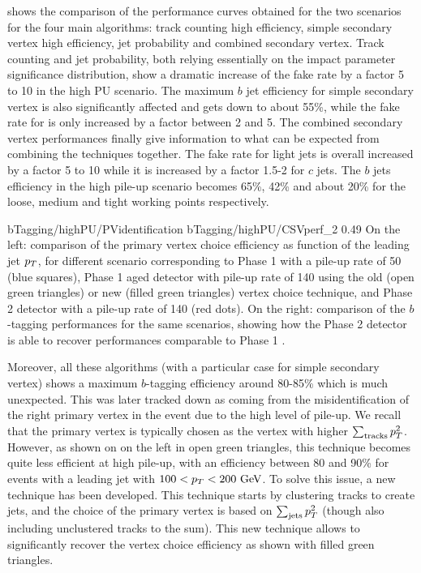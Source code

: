      shows the comparison of the performance
    curves obtained for the two scenarios for the four main algorithms: track
    counting high efficiency, simple secondary vertex high efficiency, jet
    probability and combined secondary vertex.  Track counting and jet
    probability, both relying essentially on the impact parameter significance
    distribution, show a dramatic increase of the fake rate by a factor 5 to 10
    in the high PU scenario. The maximum $b$ jet efficiency for simple secondary
    vertex is also significantly affected and gets down to about 55\%, while the
    fake rate for is only increased by a factor between 2 and 5. The combined
    secondary vertex performances finally give information to what can be
    expected from combining the techniques together. The fake rate for light
    jets is overall increased by a factor 5 to 10 while it is increased by a
    factor 1.5-2 for $c$ jets. The $b$ jets efficiency in the high pile-up
    scenario becomes 65\%, 42\% and about 20\% for the loose, medium and tight
    working points respectively.

                     {bTagging/highPU/PVidentification}
                     {bTagging/highPU/CSVperf_2}
                     {0.49}
                     {On the left: comparison of the primary vertex choice
                     efficiency as function of the leading jet $p_T$, for
                     different scenario corresponding to Phase 1 with a pile-up
                     rate of 50 (blue squares), Phase 1 aged detector with
                     pile-up rate of 140 using the old (open green triangles) or
                     new (filled green triangles) vertex choice technique, and
                     Phase 2 detector with a pile-up rate of 140 (red dots).  On
                     the right: comparison of the $b$-tagging performances for
                     the same scenarios, showing how the Phase 2 detector is
                     able to recover performances comparable to Phase 1
                     \cite{Phase2TDR}.}

    Moreover, all these algorithms (with a particular case for simple secondary
    vertex) shows a maximum $b$-tagging efficiency around 80-85\% which is much
    unexpected. This was later \cite{Phase2TDR} tracked down as coming from the
    misidentification of the right primary vertex in the event due to the high
    level of pile-up. We recall that the primary vertex is typically chosen as
    the vertex with higher $\sum_\text{tracks} p_T^2$. However, as shown on
     on the left in open green triangles, this
    technique becomes quite less efficient at high pile-up, with an efficiency
    between 80 and 90\% for events with a leading jet with $100 < p_T < 200
    ~\text{GeV}$. To solve this issue, a new technique has been developed. This
    technique starts by clustering tracks to create jets, and the choice of the
    primary vertex is based on $\sum_\text{jets} p_T^2$ (though also including
    unclustered tracks to the sum). This new technique allows to significantly
    recover the vertex choice efficiency as shown with filled green triangles.

